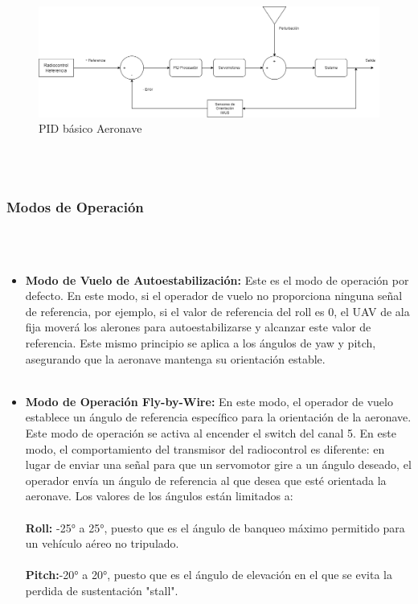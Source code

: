 \begin{figure}[H]
    \centering
    \includegraphics[width=\textwidth]{Imagenes/Firmware/PID basico.png}
    \caption{PID básico Aeronave }
    \label{fig:pid1 }
\end{figure} \\ \\

\subsubsection{Modos de Operación} \\ \\
\begin{itemize}
    \item \textbf{Modo de Vuelo de Autoestabilización:} Este es el modo de operación por defecto. En este modo, si el operador de vuelo no proporciona ninguna señal de referencia, por ejemplo, si el valor de referencia del roll es 0, el UAV de ala fija moverá los alerones para autoestabilizarse y alcanzar este valor de referencia. Este mismo principio se aplica a los ángulos de yaw y pitch, asegurando que la aeronave mantenga su orientación estable.
\\ \\
    \item \textbf{Modo de Operación Fly-by-Wire:} En este modo, el operador de vuelo establece un ángulo de referencia específico para la orientación de la aeronave. Este modo de operación se activa al encender el switch del canal 5. En este modo, el comportamiento del transmisor del radiocontrol es diferente: en lugar de enviar una señal para que un servomotor gire a un ángulo deseado, el operador envía un ángulo de referencia al que desea que esté orientada la aeronave. Los valores de los ángulos están limitados a: \\ \\

\textbf{Roll:} -25° a 25°, puesto que es el ángulo de banqueo máximo permitido para un vehículo aéreo no tripulado. \\ \\
\textbf{Pitch:}-20° a 20°, puesto que es el ángulo de elevación en el que se evita la perdida de sustentación "stall".
\end{itemize}




